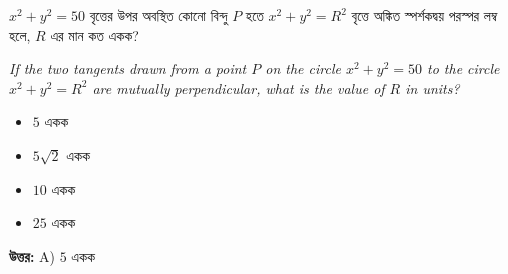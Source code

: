 \documentclass[12pt, a4paper]{article}
\begin{document}
\vspace{2em}

\begin{tcolorbox}[questionbox={প্রশ্ন (Question) 15}]
    \noindent
    $x^2 + y^2 = 50$ বৃত্তের উপর অবস্থিত কোনো বিন্দু $P$ হতে $x^2 + y^2 = R^2$ বৃত্তে অঙ্কিত স্পর্শকদ্বয় পরস্পর লম্ব হলে, $R$ এর মান কত একক?
    
    \vspace{0.8em}
    \begin{english}
    \noindent\textit{\color{darkgray}
    If the two tangents drawn from a point $P$ on the circle $x^2 + y^2 = 50$ to the circle $x^2 + y^2 = R^2$ are mutually perpendicular, what is the value of $R$ in units?
    }
    \end{english}
\end{tcolorbox}

\vspace{1em}
\begin{itemize}[label={}, leftmargin=1cm, itemsep=0.5em]
    \item[\textbf{A)}] $5$ একক
    \item[\textbf{B)}] $5\sqrt{2}$ একক
    \item[\textbf{C)}] $10$ একক
    \item[\textbf{D)}] $25$ একক
\end{itemize}

\vspace{0.5em}
\begin{tcolorbox}[answerbox]
    \textbf{\color{success} উত্তর:} A) $5$ একক
\end{tcolorbox}
\vspace{1em}
\end{document}
